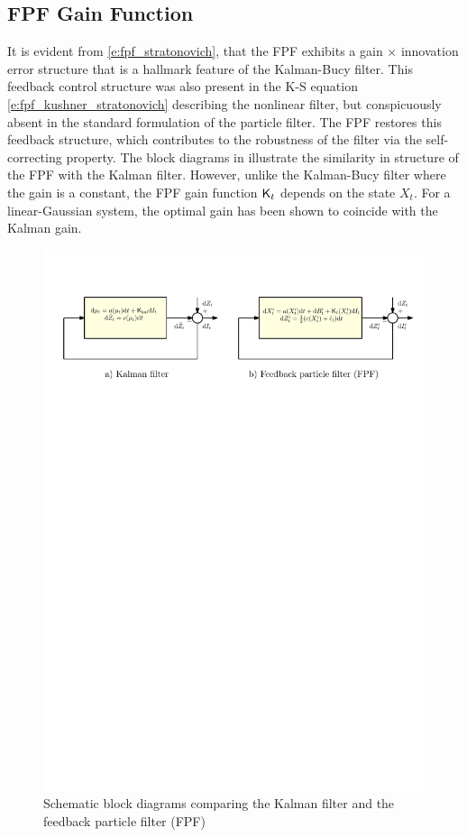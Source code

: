 \subsection*{FPF Gain Function}
\label{s:fpf_gain}
It is evident from \eqref{e:fpf_stratonovich}, that the FPF exhibits a gain $\times$ innovation error structure that is a hallmark feature of the Kalman-Bucy filter. This feedback control structure was also present in the K-S equation \eqref{e:fpf_kushner_stratonovich} describing the nonlinear filter, but conspicuously absent in the standard formulation of the particle filter. The FPF restores this feedback structure, which contributes to the robustness of the filter via the self-correcting property.  The block diagrams in  illustrate the similarity in structure of the FPF with the Kalman filter. However, unlike the Kalman-Bucy filter where the gain is a constant, the FPF gain function $\text{\sf K}_t$ depends on the state $X_t$. For a linear-Gaussian system, the optimal gain has been shown to coincide with the Kalman gain. 
\begin{figure}
	\centering
		\includegraphics[width = 7in]{images/Chap4_FPF_Kalman}
		\caption{Schematic block diagrams comparing the Kalman filter and the feedback particle filter (FPF) \cite{yanmehmey13}}
		\label{fig:fpf_kalman}
\end{figure}

